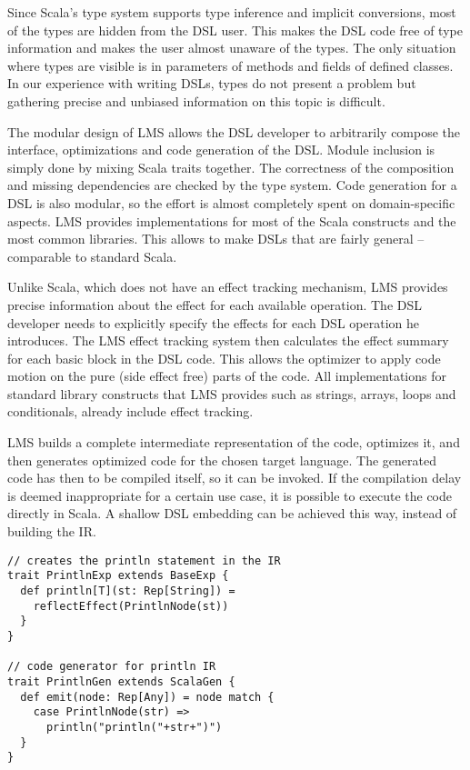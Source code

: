 Since Scala's type system supports type inference and implicit conversions, most
of the  types are hidden from the DSL user. This makes the DSL code
free of type information and makes the user almost unaware of the 
types. The only situation where  types are visible is in
parameters of methods and fields of defined classes. In our experience
with writing DSLs,  types do not present a problem but gathering
precise and unbiased information on this topic is difficult.

The modular design of LMS allows the DSL developer to arbitrarily compose the
interface, optimizations and code generation of the DSL. Module inclusion is
simply done by mixing Scala traits together. The correctness of the composition
and missing dependencies are checked by the type system. Code generation for a
DSL is also modular, so the effort is almost completely spent on domain-specific
aspects. LMS provides implementations for most of the Scala constructs and the
most common libraries. This allows to make DSLs that are fairly general --
comparable to standard Scala.

Unlike Scala, which does not have an effect tracking mechanism, LMS provides
precise information about the effect for each available operation. The DSL
developer needs to explicitly specify the effects for each DSL operation he
introduces. The LMS effect tracking system then calculates the effect summary
for each basic block in the DSL code. This allows the optimizer to apply code
motion on the pure (side effect free) parts of the code. All implementations for
standard library constructs that LMS provides such as strings, arrays, loops and
conditionals, already include effect tracking.

LMS builds a complete intermediate representation of the code, optimizes it, and
then generates optimized code for the chosen target language. The generated code
has then to be compiled itself, so it can be invoked. If the compilation
delay is deemed inappropriate for a certain use case, it is possible to execute
the code directly in Scala. A shallow DSL embedding can be achieved this way,
instead of building the IR.

\begin{lstlisting}[name=code, caption=Example of the DSL module used for
printing strings.
,captionpos=b, label=lst:println_dsl, float=t] 
// creates the println statement in the IR 
trait PrintlnExp extends BaseExp {
  def println[T](st: Rep[String]) =
    reflectEffect(PrintlnNode(st)) 
  }
}

// code generator for println IR
trait PrintlnGen extends ScalaGen {
  def emit(node: Rep[Any]) = node match {
    case PrintlnNode(str) =>
      println("println("+str+")")
  }
}
\end{lstlisting}

